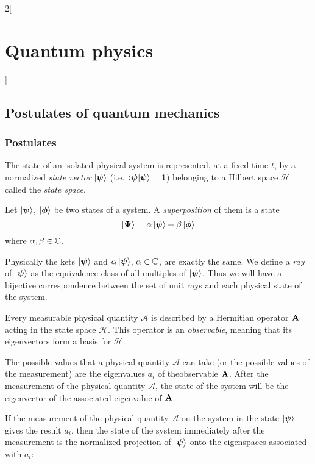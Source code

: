 \documentclass[../../../main_physics.tex]{subfiles}
\begin{document}
\begin{multicols}{2}[\section{Quantum physics}]
  \subsection{Postulates of quantum mechanics}
  \subsubsection{Postulates}
  \begin{definition}[Postulate I]
    The state of an isolated physical system is represented, at a fixed time $t$, by a normalized \emph{state vector} $\ket{\boldsymbol{\mathrm{\psi}}}$ (i.e. $\braket{\boldsymbol{\mathrm{\psi}}}{\boldsymbol{\mathrm{\psi}}}=1$) belonging to a Hilbert space $\mathcal{H}$ called the \emph{state space}.
  \end{definition}
  \begin{definition}
    Let $\ket{\boldsymbol{\mathrm{\psi}}}$, $\ket{\boldsymbol{\mathrm{\phi}}}$ be two states of a system. A \emph{superposition} of them is a state $$\ket{\boldsymbol{\mathrm{\Psi}}}=\alpha\ket{\boldsymbol{\mathrm{\psi}}}+\beta\ket{\boldsymbol{\mathrm{\phi}}}$$ where $\alpha,\beta\in\mathbb{C}$.
  \end{definition}
  \begin{definition}
    Physically the kets $\ket{\boldsymbol{\mathrm{\psi}}}$ and $\alpha\ket{\boldsymbol{\mathrm{\psi}}}$, $\alpha\in\mathbb{C}$, are exactly the same. We define a \emph{ray} of $\ket{\boldsymbol{\mathrm{\psi}}}$ as the equivalence class of all multiples of $\ket{\boldsymbol{\mathrm{\psi}}}$. Thus we will have a bijective correspondence between the set of unit rays and each physical state of the system.
  \end{definition}
  \begin{definition}[Postulate II]
    Every measurable physical quantity $\mathcal{A}$ is described by a Hermitian operator $\boldsymbol{\mathrm{A}}$ acting in the state space $\mathcal{H}$. This operator is an \emph{observable}, meaning that its eigenvectors form a basis for $\mathcal{H}$.
  \end{definition}
  \begin{definition}
    The possible values that a physical quantity $\mathcal{A}$ can take (or the possible values of the measurement) are the eigenvalues $a_i$ of theobservable $\boldsymbol{\mathrm{A}}$. After the measurement of the physical quantity $\mathcal{A}$, the state of the system will be the eigenvector of the associated eigenvalue of $\boldsymbol{\mathrm{A}}$.
  \end{definition}
  \begin{definition}
    If the measurement of the physical quantity $\mathcal{A}$ on the system in the state $\ket{\boldsymbol{\mathrm{\psi}}}$ gives the result $a_i$, then the state of the system immediately after the measurement is the normalized projection of $\ket{\boldsymbol{\mathrm{\psi}}}$ onto the eigenspaces associated with $a_i$:

\end{definition}
\end{multicols}
\end{document}
